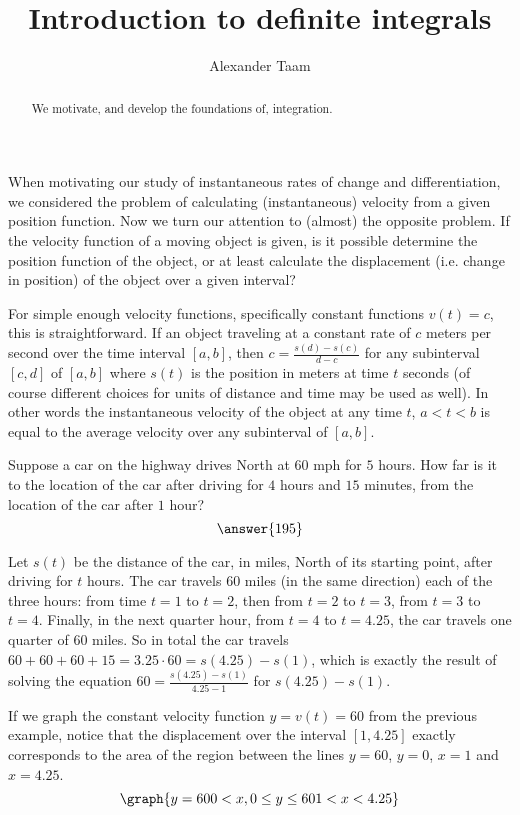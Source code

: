 \documentclass{ximera}
\title{Introduction to definite integrals}
\author{Alexander Taam}
\begin{document}
\begin{abstract}
  We motivate, and develop the foundations of, integration.
\end{abstract}
\maketitle

When motivating our study of instantaneous rates of change and differentiation, we considered the problem of calculating (instantaneous) velocity from a given position function. Now we turn our attention to (almost) the opposite problem. If the velocity function of a moving object is given, is it possible determine the position function of the object, or at least calculate the displacement (i.e. change in position) of the object over a given interval?

For simple enough velocity functions, specifically constant functions $v(t)=c$, this is straightforward. If an object traveling at a constant rate of $c$ meters per second over the time interval $[a,b]$, then $c=\frac{s(d)-s(c)}{d-c}$ for any subinterval $[c,d]$ of $[a,b]$ where $s(t)$ is the position in meters at time $t$ seconds (of course different choices for units of distance and time may be used as well). In other words the instantaneous velocity of the object at any time $t$, $a<t<b$ is equal to the average velocity over any subinterval of $[a,b]$.

\begin{example}
Suppose a car on the highway drives North at $60$ mph for $5$ hours. How far is it to the location of the car after driving for $4$ hours and $15$ minutes, from the location of the car after $1$ hour? \[\answer{195}\]

\begin{feedback} Let $s(t)$ be the distance of the car, in miles, North of its starting point, after driving for $t$ hours. The car travels $60$ miles (in the same direction) each of the three hours: from time $t=1$ to $t=2$, then from $t=2$ to $t=3$, from $t=3$ to $t=4$. Finally, in the next quarter hour, from $t=4$ to $t=4.25$, the car travels one quarter of $60$ miles. So in total the car travels $60+60+60+15=3.25\cdot60=s(4.25)-s(1)$, which is exactly the result of solving the equation $60=\frac{s(4.25)-s(1)}{4.25-1}$ for $s(4.25)-s(1)$.
\end{feedback}
\end{example}

If we graph the constant velocity function $y=v(t)=60$ from the previous example, notice that the displacement over the interval $[1,4.25]$ exactly corresponds to the area of the region between the lines $y=60$, $y=0$, $x=1$ and $x=4.25$.
\[
\graph{y=60{0< x},0\leq y\leq 60{1< x< 4.25}}
\]
\end{document}
